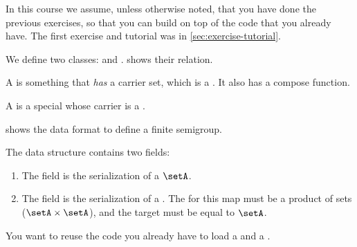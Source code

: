 
\begin{remark}
    In this course we assume, unless otherwise noted, that you have done the previous exercises, so that you can build on top of the code that you already have.
    The first exercise and tutorial was in \cref{sec:exercise-tutorial}.
\end{remark}

\begin{figure*}[b]
    \caption{}
    \label{fig:uml_semigroup}
\end{figure*}

We define two classes: \Semigroup and \FiniteSemigroup.
 shows their relation.

A \Semigroup is something that \emph{has} a carrier set, which is a \Setoid.
It also has a compose function.


A \FiniteSemigroup is a special \Semigroup whose carrier is a \FiniteSet.


\begin{marginfigure}%
    \caption{}%
    \label{fig:sm_min3}%
\end{marginfigure}%

 shows the data format to define a finite semigroup.

The data structure contains two fields:
\begin{enumerate}
    \item The field  is the serialization of a \FiniteSet $\setA$.
    \item The field is the serialization of a \FiniteMap.
          The  for this map must be a product of sets ($\setA \times \setA$), and the target must be equal to $\setA$.
\end{enumerate}



\begin{hint}
    You want to reuse the code you already have to load a \FiniteSet and a \FiniteMap.
\end{hint}

